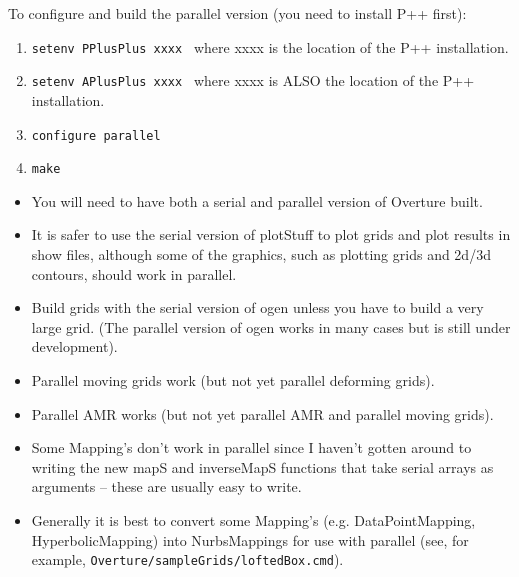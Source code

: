 \documentclass{article}
\begin{document}
To configure and build the parallel version (you need to install P++ first):
\begin{enumerate}
  \item {\tt setenv PPlusPlus xxxx } where xxxx is the location of the P++ installation.
  \item {\tt setenv APlusPlus xxxx } where xxxx is ALSO the location of the P++ installation.
  \item {\tt configure parallel} 
  \item {\tt make} 
\end{enumerate}


\begin{itemize}
  \item You will need to have both a serial and parallel version of Overture built.
  \item It is safer to use the serial version of plotStuff to plot grids and plot results in show files, although
        some of the graphics, such as plotting grids and 2d/3d contours, should work in parallel.
  \item Build grids with the serial version of ogen unless you have to build a very large grid. (The parallel version of ogen
        works in many cases but is still under development).
  \item Parallel moving grids work (but not yet parallel deforming grids).
  \item Parallel AMR works (but not yet parallel AMR and parallel moving grids).
  \item Some Mapping's don't work in parallel since I haven't gotten around to writing the
     new mapS and inverseMapS functions that take serial arrays as arguments 
     -- these are usually easy to write. 
  \item Generally it is best to convert some Mapping's (e.g. DataPointMapping, HyperbolicMapping)
       into NurbsMappings for use with parallel (see, for example, {\tt Overture/sampleGrids/loftedBox.cmd}). 
\end{itemize}
\end{document}
